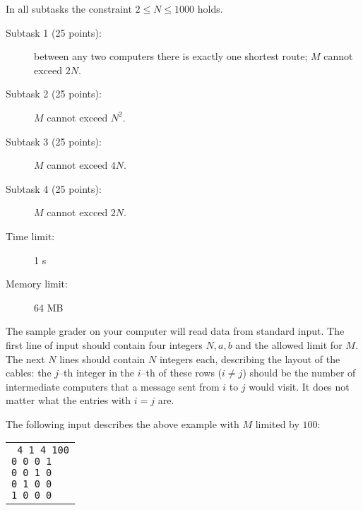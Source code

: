 \documentclass{boi2014}
\begin{document}
    \Scoring
    In all subtasks the constraint $2 \le N \le 1000$ holds.

    \begin{description}

        \item[Subtask 1 (25 points):] between
            any two computers there is exactly one shortest route; $M$
            cannot exceed $2N$.
        \item[Subtask 2 (25 points):] $M$ cannot exceed $N^2$.
        \item[Subtask 3 (25 points):] $M$ cannot exceed $4N$.
        \item[Subtask 4 (25 points):] $M$ cannot excced $2N$.
    \end{description}

    \Constraints
    \begin{description}
        \item[Time limit:] 1 s
        \item[Memory limit:] 64 MB
    \end{description}

    \Experimentation
    The sample grader on your computer will read data from standard input.
    The first line of input should contain four integers $N, a, b$ and the
    allowed limit for $M$. The next $N$ lines should
    contain $N$ integers each, describing the layout of the cables:
    the $j$--th integer in the $i$--th of these rows ($i \neq j$) should be
    the number of intermediate computers that a message sent from $i$ to $j$
    would visit. It does not matter what the entries with $i = j$ are.

    The following input describes the above example with $M$ limited by
    $100$:

    \begin{center}
        \begin{tabular}{p{4cm}}
            {\tt
                4 1 4 100 \newline
                0 0 0 1 \newline
                0 0 1 0 \newline
                0 1 0 0 \newline
                1 0 0 0
            }
        \end{tabular}
    \end{center}
\end{document}
